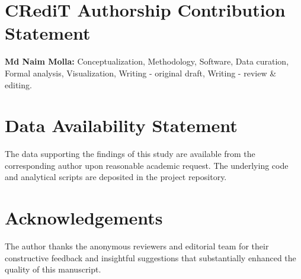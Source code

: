 \documentclass[11pt,a4paper]{article}
\begin{document}
\section*{CRediT Authorship Contribution Statement}
\textbf{Md Naim Molla:} Conceptualization, Methodology, Software, Data curation, Formal analysis, Visualization, Writing - original draft, Writing - review \& editing.

\section*{Data Availability Statement}
The data supporting the findings of this study are available from the corresponding author upon reasonable academic request. The underlying code and analytical scripts are deposited in the project repository.

\section*{Acknowledgements}
The author thanks the anonymous reviewers and editorial team for their constructive feedback and insightful suggestions that substantially enhanced the quality of this manuscript.
\end{document}
